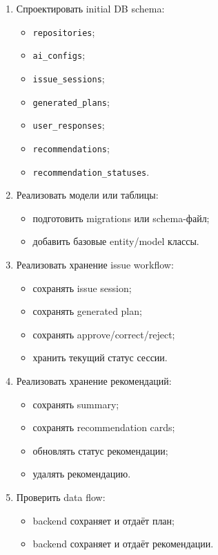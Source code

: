 \documentclass[12pt,a4paper]{article}
\begin{document}
\begin{enumerate}
    \item Спроектировать initial DB schema:
    \begin{itemize}
        \item \texttt{repositories};
        \item \texttt{ai\_configs};
        \item \texttt{issue\_sessions};
        \item \texttt{generated\_plans};
        \item \texttt{user\_responses};
        \item \texttt{recommendations};
        \item \texttt{recommendation\_statuses}.
    \end{itemize}

    \item Реализовать модели или таблицы:
    \begin{itemize}
        \item подготовить migrations или schema-файл;
        \item добавить базовые entity/model классы.
    \end{itemize}

    \item Реализовать хранение issue workflow:
    \begin{itemize}
        \item сохранять issue session;
        \item сохранять generated plan;
        \item сохранять approve/correct/reject;
        \item хранить текущий статус сессии.
    \end{itemize}

    \item Реализовать хранение рекомендаций:
    \begin{itemize}
        \item сохранять summary;
        \item сохранять recommendation cards;
        \item обновлять статус рекомендации;
        \item удалять рекомендацию.
    \end{itemize}

    \item Проверить data flow:
    \begin{itemize}
        \item backend сохраняет и отдаёт план;
        \item backend сохраняет и отдаёт рекомендации.
    \end{itemize}
\end{enumerate}
\end{document}
